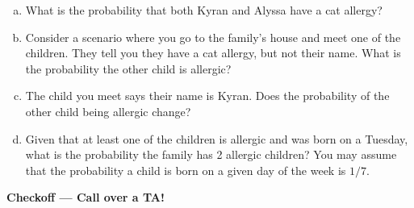 \documentclass[12pt,letterpaper]{article}
\newenvironment{22enumerate}{\begin{enumerate}[a.]\itemsep0em}{\end{enumerate}}
\begin{document}
\begin{22enumerate}
\item What is the probability that both Kyran and Alyssa have a cat allergy?
\begin{mdframed} \vspace{1cm} \end{mdframed}
\item Consider a scenario where you go to the family's house and meet one of the children. They tell you they have a cat allergy, but not their name. What is the probability the other child is allergic?
\begin{mdframed} \vspace{1cm} \end{mdframed}
\item The child you meet says their name is Kyran. Does the probability of the other child being allergic change?
\begin{mdframed} \vspace{1cm} \end{mdframed}
\item Given that at least one of the children is allergic and was born on a Tuesday, what is the probability the family has 2 allergic children? You may assume that the probability a child is born on a given day of the week is $1/7$.
\begin{mdframed} \vspace{3cm} \end{mdframed}
\end{22enumerate}

\textbf{Checkoff — Call over a TA!}
\end{document}
